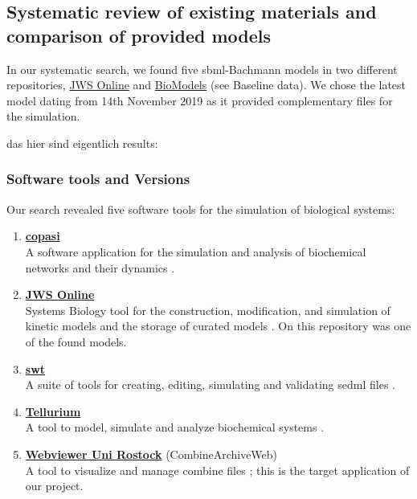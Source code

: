 \subsection*{Systematic review of existing materials and comparison of provided models}
In our systematic search, we found five \ac{sbml}-Bachmann models in two different repositories, \hyperlink{https://www.systemsmedicine.net/posts/jws-online-biological-systems-modelling}{JWS Online} and \hyperlink{https://www.ebi.ac.uk/biomodels/}{BioModels} (see Baseline data). We chose the latest model dating from 14th November 2019 as it provided complementary files for the simulation.


\textsf{das hier sind eigentlich results:}\\
\subsubsection*{Software tools and Versions}
Our search revealed five software tools for the simulation of biological systems:
\begin{enumerate} 
    \item \hyperlink{http://copasi.org/}{\textbf{\ac{copasi}}}\\A software application for the simulation and analysis of biochemical networks and their dynamics \cite{copasi}.
   
    \item \hyperlink{https://www.systemsmedicine.net/posts/jws-online-biological-systems-modelling}{\textbf{JWS Online}}\\ Systems Biology tool for the construction, modification, and simulation of kinetic models and the storage of curated models \cite{jwsonline}. On this repository was one of the found models.
   
    \item \hyperlink{https://sed-ml.org/}{\textbf{\ac{swt}}}\\A suite of tools for creating, editing, simulating and validating \ac{sedml} files \cite{sedml}. 
   
    \item \hyperlink{https://tellurium.readthedocs.io/en/latest/}{\textbf{Tellurium}}\\ A tool to model, simulate and analyze biochemical systems \cite{tellurium}.
    
     \item \hyperlink{https://cat.bio.informatik.uni-rostock.de/}{\textbf{Webviewer Uni Rostock}} (CombineArchiveWeb)\\ A tool to visualize and manage \ac{combine} files \cite{combine}; this is the target application of our project. 
\end{enumerate}

